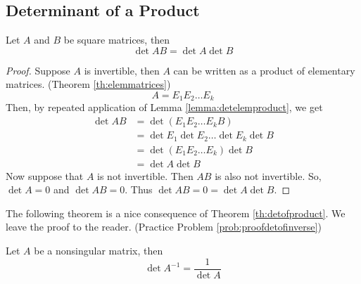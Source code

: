 \documentclass{ximera}
\begin{document}
\subsection*{Determinant of a Product}
\begin{theorem}\label{th:detofproduct}
Let $A$ and $B$ be square matrices, then
$$\det{AB}=\det{A}\det{B}$$
\end{theorem}
\begin{proof}
Suppose $A$ is invertible, then $A$ can be written as a product of elementary matrices. (Theorem \ref{th:elemmatrices})
$$A=E_1E_2\ldots E_k$$
Then, by repeated application of Lemma \ref{lemma:detelemproduct}, we get
\begin{align*}\det{AB}&=\det{(E_1E_2\ldots E_kB)}\\
&=\det{E_1}\det{E_2}\ldots \det{E_k}\det{B}\\
&=\det{(E_1E_2\ldots E_k)}\det{B}\\
&=\det{A}\det{B}
\end{align*}
Now suppose that $A$ is not invertible.  Then $AB$ is also not invertible. %
So, $\det{A}=0$ and $\det{AB}=0$.  Thus  $\det{AB}=0=\det{A}\det{B}$.
\end{proof}
The following theorem is a nice consequence of Theorem \ref{th:detofproduct}.  We leave the proof to the reader. (Practice Problem \ref{prob:proofdetofinverse})
\begin{theorem}\label{th:detofinverse} Let $A$ be a nonsingular matrix, then
$$\det{A^{-1}}=\frac{1}{\det{A}}$$
\end{theorem}
 
\end{document}
